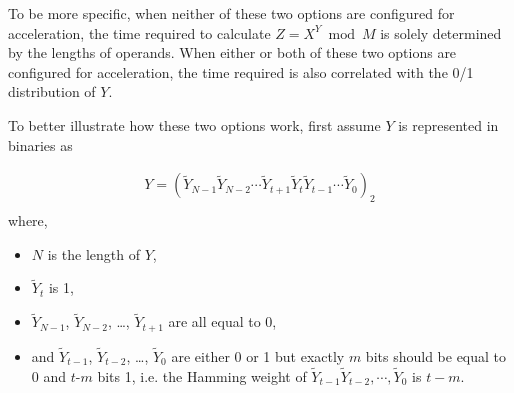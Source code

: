 \documentclass[main\_\_EN.tex]{subfiles}
\begin{document}
To be more specific, when neither of these two options are configured for acceleration, the time required to calculate \begin{math}Z = X^{Y} \bmod M\end{math} is solely determined by the lengths of operands. When either or both of these two options are configured for acceleration, the time required is also correlated with the 0/1 distribution of \begin{math}Y\end{math}. 

To better illustrate how these two options work, first assume \begin{math}Y \end{math} is represented in binaries as

\begin{gather*}
Y = ( \widetilde{Y}_{N-1} \widetilde{Y}_{N-2} \cdots \widetilde{Y}_{t+1} \widetilde{Y}_{t} \widetilde{Y}_{t-1} \cdots \widetilde{Y}_{0} )_{2} \\
\end{gather*}
where,
\begin{itemize}
    \item \begin{math} N \end{math} is the length of \begin{math}Y \end{math},
    \item \begin{math}\widetilde{Y}_{t}\end{math} is 1,
    \item \begin{math}\widetilde{Y}_{N-1}\end{math}, \begin{math}\widetilde{Y}_{N-2}\end{math}, \dots, \begin{math}\widetilde{Y}_{t+1}\end{math} are all equal to 0,
    \item and \begin{math}\widetilde{Y}_{t-1}\end{math}, \begin{math}\widetilde{Y}_{t-2}\end{math}, \dots, \begin{math}\widetilde{Y}_{0}\end{math} are either 0 or 1 but exactly \begin{math}m\end{math} bits should be equal to 0 and \begin{math}t\end{math}-\begin{math}m\end{math} bits 1, i.e. the Hamming weight of \begin{math}\widetilde{Y}_{t-1} \widetilde{Y}_{t-2}, \cdots, \widetilde{Y}_{0}\end{math} is \begin{math}t -m\end{math}.
\end{itemize}
\end{document}

